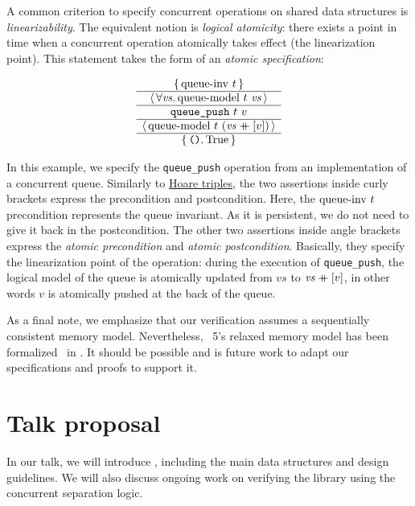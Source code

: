 \documentclass[a4paper, 11pt]{article}
\begin{document}
A common criterion to specify concurrent operations on shared data structures is \emph{linearizability}.
The equivalent \Iris notion is \emph{logical atomicity}: there exists a point in time when a concurrent operation atomically takes effect (the linearization point).
This statement takes the form of an \emph{atomic specification}:

\[
  \begin{array}{c} \left\lbrace\, 
    \mathrm{queue {\hbox{-}} inv}\ t
   \,\right\rbrace \\ \hline \left\langle\, \forall 
    \mathit{vs}
   \ldotp 
    \mathrm{queue {\hbox{-}} model}\ t\  \mathit{vs}
   \,\right\rangle \\ \hline 
    \texttt{queue\_push}\ t\ v
   \\ \hline \left\langle\, 
    \mathrm{queue {\hbox{-}} model}\ t\  (\mathit{vs} \mathbin{+\mkern-10mu+} [v])
   \,\right\rangle \\ \hline \left\lbrace\, 
    \texttt{()}
   \ldotp 
    \mathrm{True}
   \,\right\rbrace \end{array}
\]

In this example, we specify the \texttt{queue\_push} operation from an implementation of a concurrent queue.
Similarly to \href{https://en.wikipedia.org/wiki/Hoare_logic}{Hoare triples}, the two assertions inside curly brackets express the precondition and postcondition.
Here, the $\mathrm{queue {\hbox{-}} inv}\ t$ precondition represents the queue invariant.
As it is persistent, we do not need to give it back in the postcondition.
The other two assertions inside angle brackets express the \emph{atomic precondition} and \emph{atomic postcondition}.
Basically, they specify the linearization point of the operation: during the execution of \texttt{queue\_push}, the logical model of the queue is atomically updated from $\mathit{vs}$ to $\mathit{vs} \mathbin{+\mkern-10mu+} [v]$, in other words $v$ is atomically pushed at the back of the queue.

As a final note, we emphasize that our verification assumes a sequentially consistent memory model.
Nevertheless, \OCaml~5's relaxed memory model has been formalized~\cite{DBLP:journals/pacmpl/MevelJP20} in \Iris.
It should be possible and is future work to adapt our specifications and proofs to support it.


\section{Talk proposal}

In our talk, we will introduce \Saturn, including the main data structures and design guidelines.
We will also discuss ongoing work on verifying the library using the \Iris concurrent separation logic.


\printbibliography
\end{document}

